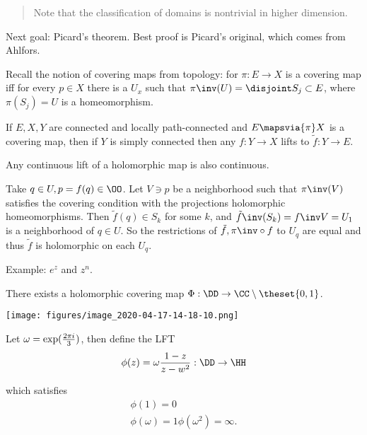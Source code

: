 \begin{quote}
Note that the classification of domains is nontrivial in higher
dimension.
\end{quote}

Next goal: Picard's theorem. Best proof is Picard's original, which
comes from Ahlfors.

Recall the notion of covering maps from topology: for \(\pi: E\to X\) is
a covering map iff for every \(p\in X\) there is a \(U_x\) such that
\(\pi\inv(U) = \disjoint S_j \subset E\), where \(\pi(S_j) = U\) is a
homeomorphism.

\begin{description}
\tightlist
\item[Proposition]
If \(E, X, Y\) are connected and locally path-connected and
\(E\mapsvia{\pi} X\) is a covering map, then if \(Y\) is simply
connected then any \(f: Y\to X\) lifts to \(\tilde f: Y\to E\).
\item[Proposition]
Any continuous lift of a holomorphic map is also continuous.
\item[Proof]
Take \(q\in U, p= f(q) \in \OO\). Let \(V \ni p\) be a neighborhood such
that \(\pi\inv(V)\) satisfies the covering condition with the
projections holomorphic homeomorphisms. Then \(\tilde f(q) \in S_k\) for
some \(k\), and \(\tilde f\inv(S_k) = f\inv V = U_1\) is a neighborhood
of \(q\in U\). So the restrictions of \(\tilde f, \pi\inv \circ f\) to
\(U_q\) are equal and thus \(\tilde f\) is holomorphic on each \(U_q\).
\end{description}

Example: \(e^z\) and \(z^n\).

\begin{description}
\tightlist
\item[Proposition]
There exists a holomorphic covering map
\(\Phi: \DD \to \CC\setminus \theset{0, 1}\).
\end{description}

\texttt{[image: figures/image\_2020-04-17-14-18-10.png]}

Let \(\omega = \exp({2\pi i \over 3})\), then define the LFT
\begin{align*}
\phi(z) = \omega{1 - z\over z - w^2}: \DD\to \HH
\end{align*}

which satisfies \begin{align*}
\phi(1) = 0\\
\phi(\omega) = 1
\phi(\omega^2) = \infty
.\end{align*}

